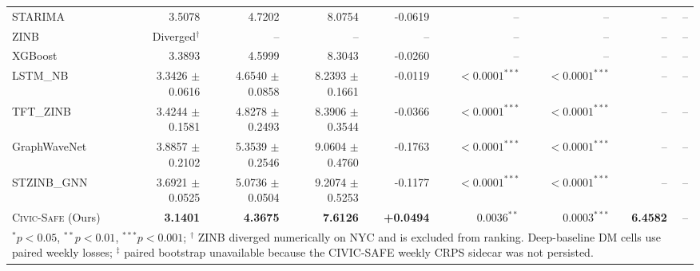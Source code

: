 \begin{table}[htbp]
\begin{tabular}{l r r r r r r r r}
    STARIMA & 3.5078 & 4.7202 & 8.0754 & -0.0619 & -- & -- & -- & -- \\
    ZINB & Diverged$^{\dagger}$ & -- & -- & -- & -- & -- & -- & -- \\
    XGBoost & 3.3893 & 4.5999 & 8.3043 & -0.0260 & -- & -- & -- & -- \\
    LSTM\_NB & 3.3426 $\pm$ 0.0616 & 4.6540 $\pm$ 0.0858 & 8.2393 $\pm$ 0.1661 & -0.0119 & \textbf{$<0.0001^{***}$} & \textbf{$<0.0001^{***}$} & -- & -- \\
    TFT\_ZINB & 3.4244 $\pm$ 0.1581 & 4.8278 $\pm$ 0.2493 & 8.3906 $\pm$ 0.3544 & -0.0366 & $<0.0001^{***}$ & $<0.0001^{***}$ & -- & -- \\
    GraphWaveNet & 3.8857 $\pm$ 0.2102 & 5.3539 $\pm$ 0.2546 & 9.0604 $\pm$ 0.4760 & -0.1763 & $<0.0001^{***}$ & $<0.0001^{***}$ & -- & -- \\
    STZINB\_GNN & 3.6921 $\pm$ 0.0525 & 5.0736 $\pm$ 0.0504 & 9.2074 $\pm$ 0.5253 & -0.1177 & $<0.0001^{***}$ & $<0.0001^{***}$ & -- & -- \\
    \textsc{Civic-Safe} (Ours) & \textbf{3.1401} & \textbf{4.3675} & \textbf{7.6126} & \textbf{+0.0494} & $0.0036^{**}$ & $0.0003^{***}$ & \textbf{6.4582} & -- \\
    \midrule
    \multicolumn{9}{l}{\footnotesize $^*p<0.05$, $^{**}p<0.01$, $^{***}p<0.001$; $^\dagger$ ZINB diverged numerically on NYC and is excluded from ranking. Deep-baseline DM cells use paired weekly losses; $^\ddagger$ paired bootstrap unavailable because the CIVIC-SAFE weekly CRPS sidecar was not persisted.} \\
    \bottomrule
  \end{tabular}
\end{table}